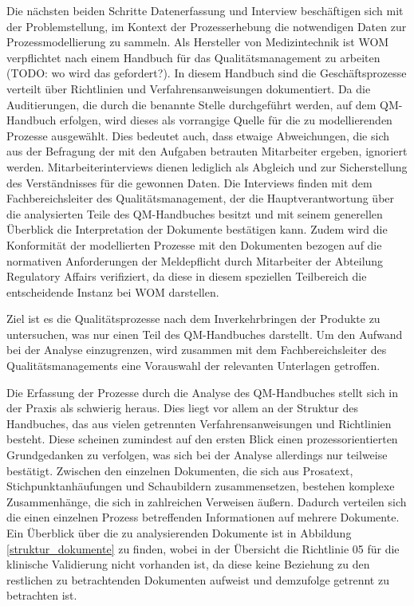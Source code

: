 \documentclass[a4paper,12pt]{report}
\begin{document}
Die nächsten beiden Schritte Datenerfassung und Interview beschäftigen sich mit der Problemstellung, im Kontext der Prozesserhebung die notwendigen Daten zur Prozessmodellierung zu sammeln. Als Hersteller von Medizintechnik ist WOM verpflichtet nach einem Handbuch für das Qualitätsmanagement zu arbeiten (TODO: wo wird das gefordert?). In diesem Handbuch sind die Geschäftsprozesse verteilt über Richtlinien und Verfahrensanweisungen dokumentiert. Da die Auditierungen, die durch die benannte Stelle durchgeführt werden, auf dem QM-Handbuch erfolgen, wird dieses als vorrangige Quelle für die zu modellierenden Prozesse ausgewählt. Dies bedeutet auch, dass etwaige Abweichungen, die sich aus der Befragung der mit den Aufgaben betrauten Mitarbeiter ergeben, ignoriert werden. Mitarbeiterinterviews dienen lediglich als Abgleich und zur Sicherstellung des Verständnisses für die gewonnen Daten. Die Interviews finden mit dem Fachbereichsleiter des Qualitätsmanagement, der die Hauptverantwortung über die analysierten Teile des QM-Handbuches besitzt und mit seinem generellen Überblick die Interpretation der Dokumente bestätigen kann. Zudem wird die Konformität der modellierten Prozesse mit den Dokumenten bezogen auf die normativen Anforderungen der Meldepflicht durch Mitarbeiter der Abteilung Regulatory Affairs verifiziert, da diese in diesem speziellen Teilbereich die entscheidende Instanz bei WOM darstellen.

Ziel ist es die Qualitätsprozesse nach dem Inverkehrbringen der Produkte zu untersuchen, was nur einen Teil des QM-Handbuches darstellt. Um den Aufwand bei der Analyse einzugrenzen, wird zusammen mit dem Fachbereichsleiter des Qualitätsmanagements eine Vorauswahl der relevanten Unterlagen getroffen.

Die Erfassung der Prozesse durch die Analyse des QM-Handbuches stellt sich in der Praxis als schwierig heraus. Dies liegt vor allem an der Struktur des Handbuches, das aus vielen getrennten Verfahrensanweisungen und Richtlinien besteht. Diese scheinen zumindest auf den ersten Blick einen prozessorientierten Grundgedanken zu verfolgen, was sich bei der Analyse allerdings nur teilweise bestätigt. Zwischen den einzelnen Dokumenten, die sich aus Prosatext, Stichpunktanhäufungen und Schaubildern zusammensetzen, bestehen komplexe Zusammenhänge, die sich in zahlreichen Verweisen äußern. Dadurch verteilen sich die einen einzelnen Prozess betreffenden Informationen auf mehrere Dokumente. Ein Überblick über die zu analysierenden Dokumente ist in Abbildung \ref{struktur_dokumente} zu finden, wobei in der Übersicht die Richtlinie 05 für die klinische Validierung nicht vorhanden ist, da diese keine Beziehung zu den restlichen zu betrachtenden Dokumenten aufweist und demzufolge getrennt zu betrachten ist.
\end{document}
